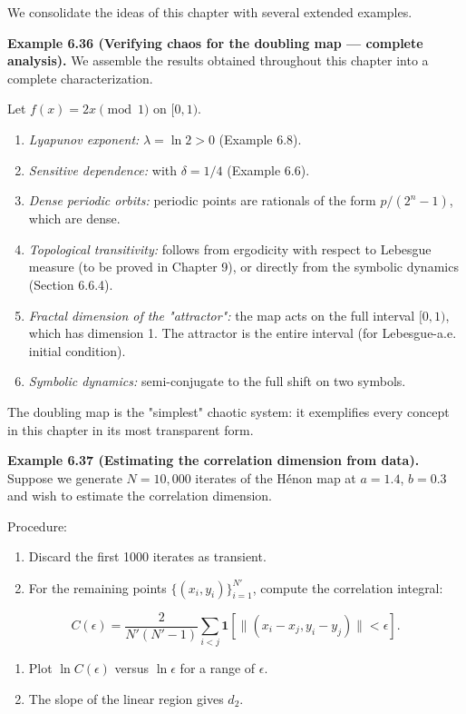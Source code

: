 We consolidate the ideas of this chapter with several extended examples.

\textbf{Example 6.36 (Verifying chaos for the doubling map --- complete analysis).} We assemble the results obtained throughout this chapter into a complete characterization.

Let $f(x) = 2x \pmod{1}$ on $[0,1)$.

\begin{enumerate}[nosep]
  \item \textit{Lyapunov exponent:} $\lambda = \ln 2 > 0$ (Example 6.8).
  \item \textit{Sensitive dependence:} with $\delta = 1/4$ (Example 6.6).
  \item \textit{Dense periodic orbits:} periodic points are rationals of the form $p/(2^n - 1)$, which are dense.
  \item \textit{Topological transitivity:} follows from ergodicity with respect to Lebesgue measure (to be proved in Chapter 9), or directly from the symbolic dynamics (Section 6.6.4).
  \item \textit{Fractal dimension of the "attractor":} the map acts on the full interval $[0,1)$, which has dimension 1. The attractor is the entire interval (for Lebesgue-a.e. initial condition).
  \item \textit{Symbolic dynamics:} semi-conjugate to the full shift on two symbols.
\end{enumerate}

The doubling map is the "simplest" chaotic system: it exemplifies every concept in this chapter in its most transparent form.

\textbf{Example 6.37 (Estimating the correlation dimension from data).} Suppose we generate $N = 10{,}000$ iterates of the Hénon map at $a = 1.4$, $b = 0.3$ and wish to estimate the correlation dimension.

Procedure:
\begin{enumerate}[nosep]
  \item Discard the first 1000 iterates as transient.
  \item For the remaining points $\{(x_i, y_i)\}_{i=1}^{N'}$, compute the correlation integral:
\end{enumerate}
\[
C(\epsilon) = \frac{2}{N'(N'-1)} \sum_{i < j} \mathbf{1}[\|(x_i - x_j, y_i - y_j)\| < \epsilon].
\]
\begin{enumerate}[nosep]
  \item Plot $\ln C(\epsilon)$ versus $\ln \epsilon$ for a range of $\epsilon$.
  \item The slope of the linear region gives $d_2$.
\end{enumerate}

